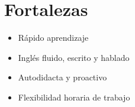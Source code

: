 \documentclass[]{article}
\begin{document}
\begin{minipage}[t]{0.4\textwidth}
{\begin{minipage}[t]{\textwidth}
    \section{\faLink\quad Fortalezas}
    \begin{large}
    \begin{itemize}
        \item[\faHourglassHalf] Rápido aprendizaje
        \item[{\faComments[regular]}] Inglés fluido, escrito y hablado
        \item[\faChild] Autodidacta y proactivo
        \item[\faRandom] Flexibilidad horaria de trabajo
    \end{itemize}
    \end{large}
    \vspace*{0.2cm}
    \end{minipage}}
\end{minipage}
\end{document}
